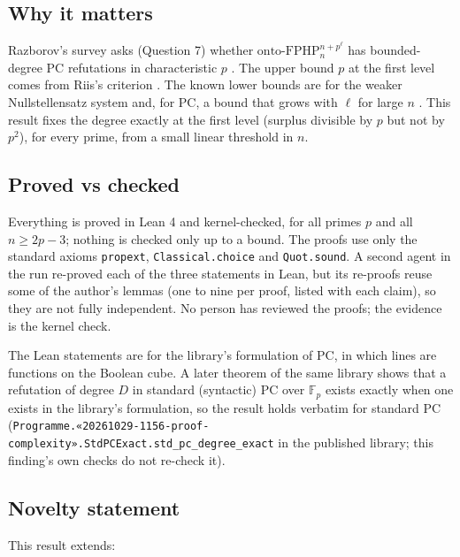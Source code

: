 \documentclass{article}
\begin{document}
\subsection*{Why it matters}

Razborov's survey asks (Question 7) whether $\mathrm{onto\text{-}FPHP}^{n+p^\ell}_n$ has
bounded-degree PC refutations in characteristic $p$ \cite{razborov2001php}. The upper bound $p$ at
the first level comes from Riis's criterion \cite{riis1993independence}. The known lower bounds are
for the weaker Nullstellensatz system \cite{beame1998counting} and, for PC, a bound that grows with
$\ell$ for large $n$ \cite{riis1997nonconstant}. This result fixes the degree exactly at the first
level (surplus divisible by $p$ but not by $p^2$), for every prime, from a small linear threshold
in $n$.

\subsection*{Proved vs checked}

Everything is proved in Lean 4 and kernel-checked, for all primes $p$ and all $n\ge2p-3$; nothing
is checked only up to a bound. The proofs use only the standard axioms \texttt{propext},
\texttt{Classical.choice} and \texttt{Quot.sound}. A second agent in the run re-proved each of the three statements in Lean, but
its re-proofs reuse some of the author's lemmas (one to nine per proof, listed with each claim), so
they are not fully independent. No person has reviewed the proofs; the evidence is the kernel check.

The Lean statements are for the library's formulation of PC, in which lines are functions on
the Boolean cube. A later theorem of the same library shows that a refutation of degree $D$ in
standard (syntactic) PC over $\mathbb F_p$ exists exactly when one exists in the library's
formulation, so the result holds verbatim for standard PC (\texttt{Programme.«20261029-1156-proof-complexity».StdPCExact.std\_pc\_degree\_exact} in the published library; this finding's own checks do not re-check it).

\subsection*{Novelty statement}

This result extends:
\end{document}
